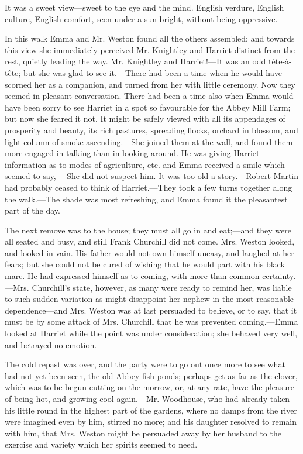 It was a sweet view---sweet to the eye and the mind. English verdure, English culture, English comfort, seen under a sun bright, without being oppressive.

In this walk Emma and Mr. Weston found all the others assembled; and towards this view she immediately perceived Mr. Knightley and Harriet distinct from the rest, quietly leading the way. Mr. Knightley and Harriet!---It was an odd tête-à-tête; but she was glad to see it.---There had been a time when he would have scorned her as a companion, and turned from her with little ceremony. Now they seemed in pleasant conversation. There had been a time also when Emma would have been sorry to see Harriet in a spot so favourable for the Abbey Mill Farm; but now she feared it not. It might be safely viewed with all its appendages of prosperity and beauty, its rich pastures, spreading flocks, orchard in blossom, and light column of smoke ascending.---She joined them at the wall, and found them more engaged in talking than in looking around. He was giving Harriet information as to modes of agriculture, etc. and Emma received a smile which seemed to say, ---She did not suspect him. It was too old a story.---Robert Martin had probably ceased to think of Harriet.---They took a few turns together along the walk.---The shade was most refreshing, and Emma found it the pleasantest part of the day.

The next remove was to the house; they must all go in and eat;---and they were all seated and busy, and still Frank Churchill did not come. Mrs. Weston looked, and looked in vain. His father would not own himself uneasy, and laughed at her fears; but she could not be cured of wishing that he would part with his black mare. He had expressed himself as to coming, with more than common certainty. ---Mrs. Churchill's state, however, as many were ready to remind her, was liable to such sudden variation as might disappoint her nephew in the most reasonable dependence---and Mrs. Weston was at last persuaded to believe, or to say, that it must be by some attack of Mrs. Churchill that he was prevented coming.---Emma looked at Harriet while the point was under consideration; she behaved very well, and betrayed no emotion.

The cold repast was over, and the party were to go out once more to see what had not yet been seen, the old Abbey fish-ponds; perhaps get as far as the clover, which was to be begun cutting on the morrow, or, at any rate, have the pleasure of being hot, and growing cool again.---Mr. Woodhouse, who had already taken his little round in the highest part of the gardens, where no damps from the river were imagined even by him, stirred no more; and his daughter resolved to remain with him, that Mrs. Weston might be persuaded away by her husband to the exercise and variety which her spirits seemed to need.

